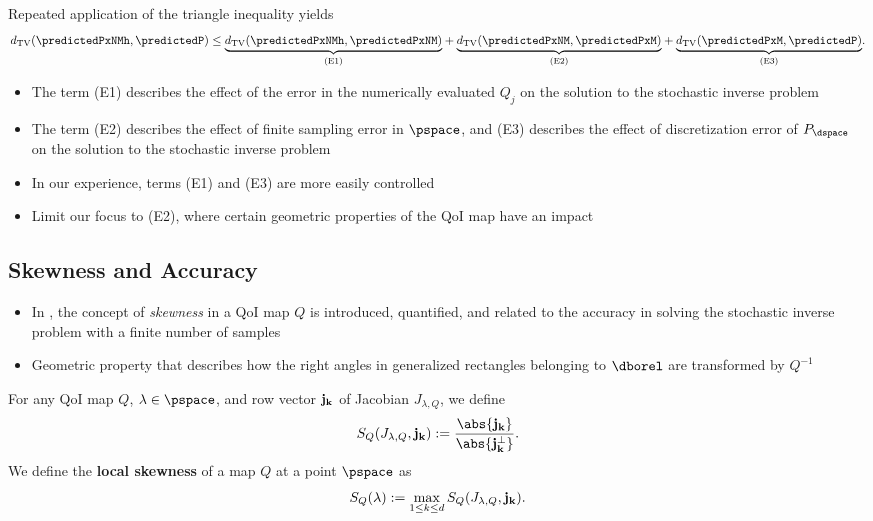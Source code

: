 \begin{frame}[t]

Repeated application of the triangle inequality yields
\begin{equation}
\label{eq:triangleineq}
d_{\text{TV}}(\predictedPxNMh, \predictedP) \leq 
\underset{ \text{(E1)} }{\underbrace{ d_{\text{TV}}(\predictedPxNMh, \predictedPxNM)}} + 
\underset{ \text{(E2)} }{\underbrace{ d_{\text{TV}}(\predictedPxNM, \predictedPxM) }}+ 
\underset{ \text{(E3)} }{\underbrace{ d_{\text{TV}}(\predictedPxM, \predictedP) }}.
\end{equation}
\begin{itemize}

	\item <1-> The term (E1) describes the effect of the error in the numerically evaluated $Q_j$ on the solution to the stochastic inverse problem
	\item <2-> The term (E2) describes the effect of finite sampling error in $\pspace$, and (E3) describes the effect of discretization error of $P_\dspace$ on the solution to the stochastic inverse problem
	\item <3-> In our experience, terms (E1) and (E3) are more easily controlled
	\item <3-> Limit our focus to (E2), where certain geometric properties of the QoI map have an impact
\end{itemize}
\end{frame}

\subsection{Skewness and Accuracy}
\begin{frame}[t]
\begin{itemize}
	\item In \cite{BGE+15}, the concept of \emph{skewness} in a QoI map $Q$ is introduced, quantified, and related to the accuracy in solving the stochastic inverse problem with a finite number of samples
	\item Geometric property that describes how the right angles in generalized rectangles belonging to $\dborel$ are transformed by $Q^{-1}$
\end{itemize}

\begin{defn}
For any QoI map $Q$, $\lambda \in \pspace$, and row vector $\bf{j}_k$ of Jacobian $J_{\lambda, Q}$, we define
\begin{equation}
S_Q(J_{\lambda,Q}, \bf{j}_k) := \frac{\abs{\bf{j}_k} }{\abs{\bf{j}_k^\perp}}.
\label{eq:skewness}
\end{equation}
We define the \textbf{local skewness} of a map $Q$ at a point $\pspace$ as 
\begin{equation}
S_Q(\lambda) := \max_{1\leq k \leq d} S_Q(J_{\lambda,Q}, \bf{j}_k).
\label{eq:localskewness}
\end{equation}
\end{defn}

\end{frame}

